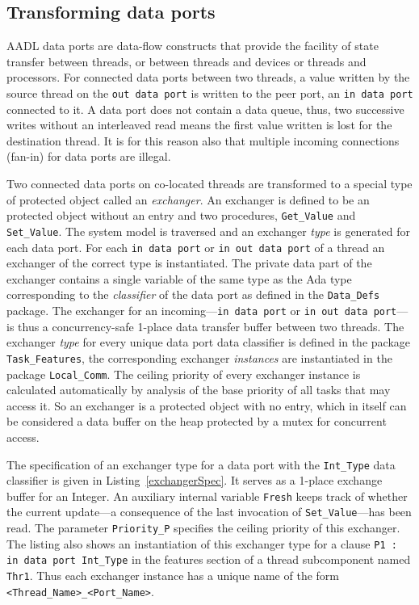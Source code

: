 \subsection{Transforming data ports}
\label{sec:dataports}
AADL data ports are data-flow constructs that provide the facility of
state transfer between threads, or between threads and devices or
threads and processors. For connected data ports between two threads,
a value written by the source thread on the \texttt{out data port} is
written to the peer port, an \texttt{in data port} connected to it. A
data port does not contain a data queue, thus, two successive writes
without an interleaved read means the first value written is lost for
the destination thread. It is for this reason also that multiple
incoming connections (fan-in) for data ports are illegal.

Two connected data ports on co-located threads are transformed to a
special type of protected object called an \emph{exchanger}. An
exchanger is defined to be an \ada protected object without an entry
and two procedures, \texttt{Get\_Value} and \texttt{Set\_Value}. The
system model is traversed and an exchanger \emph{type} is generated
for each data port. For each \texttt{in data port} or \texttt{in out
  data port} of a thread an exchanger of the correct type is
instantiated. The private data part of the exchanger contains a single
variable of the same type as the Ada type corresponding to the
\emph{classifier} of the data port as defined in the
\texttt{Data\_Defs} package. The exchanger for an
incoming---\texttt{in data port} or \texttt{in out data port}---is
thus a concurrency-safe 1-place data transfer buffer between two
threads. The exchanger \emph{type} for every unique data port data
classifier is defined in the package \texttt{Task\_Features}, the
corresponding exchanger \emph{instances} are instantiated in the
package \texttt{Local\_Comm}. The ceiling priority of every exchanger
instance is calculated automatically by analysis of the base priority
of all tasks that may access it. So an exchanger is a protected object
with no entry, which in itself can be considered a data buffer on the
heap protected by a mutex for concurrent access.

The specification of an exchanger type for a data port with the
\texttt{Int\_Type} data classifier is given in
Listing~\ref{exchangerSpec}. It serves as a 1-place exchange buffer
for an Integer. An auxiliary internal variable \texttt{Fresh} keeps
track of whether the current update---a consequence of the last
invocation of \texttt{Set\_Value}---has been read. The parameter
\texttt{Priority\_P} specifies the ceiling priority of this
exchanger. The listing also shows an instantiation of this exchanger
type for a clause \texttt{P1 : in data port Int\_Type} in the features
section of a thread subcomponent named \texttt{Thr1}. Thus each
exchanger instance has a unique name of the form
\texttt{<Thread\_Name>\_<Port\_Name>}.

